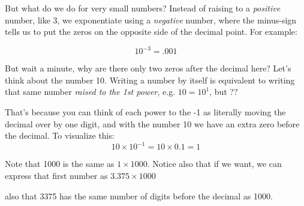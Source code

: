 \documentclass[12pt]{article}
\begin{document}
But what do we do for very small numbers? Instead of raising to a \textit{positive} number, like 3, we exponentiate using a \textit{negative} number, where the minus-sign tells us to put the zeros on the opposite side of the decimal point. For example:

\begin{equation*}
	10^{-3} = .001
\end{equation*}

But wait a minute, why are there only two zeros after the decimal here? Let's think about the number 10. Writing a number by itself is equivalent to writing that same number \textit{raised to the 1st power}, e.g. $10 = 10^1$, but ??	

That's because you can think of each power to the -1 as literally moving the decimal over by one digit, and with the number 10 we have an extra zero before the decimal. To visualize this:
\begin{equation*}
	10\times10^{-1} = 10\times0.1 = 1
\end{equation*}

Note that 1000 is the same as $1 \times 1000$. Notice also that if we want, we can express that first number as $ 3.375 \times 1000$

also that 3375 has the same number of digits before the decimal as 1000. 
\end{document}
